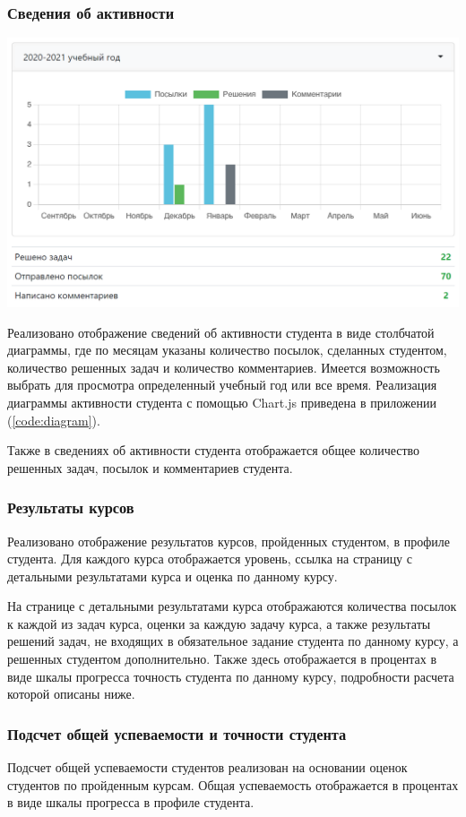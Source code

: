\documentclass[14pt, a4paper, oneside]{extarticle}
\begin{document}
\subsubsection{Сведения об активности}
\begin{center}
    \includegraphics[scale=0.4]{account-activity}
\end{center}

Реализовано отображение сведений об активности студента в виде столбчатой диаграммы, где по месяцам указаны количество посылок, сделанных студентом, количество решенных задач и количество комментариев. Имеется возможность выбрать для просмотра определенный учебный год или все время. Реализация диаграммы активности студента с помощью Chart.js приведена в приложении (\ref{code:diagram}).

Также в сведениях об активности студента отображается общее количество решенных задач, посылок и комментариев студента.
\subsubsection{Результаты курсов}
Реализовано отображение результатов курсов, пройденных студентом, в профиле студента. Для каждого курса отображается уровень, ссылка на страницу с детальными результатами курса и оценка по данному курсу.

На странице с детальными результатами курса отображаются количества посылок к каждой из задач курса, оценки за каждую задачу курса, а также результаты решений задач, не входящих в обязательное задание студента по данному курсу, а решенных студентом дополнительно. Также здесь отображается в процентах в виде шкалы прогресса точность студента по данному курсу, подробности расчета которой описаны ниже.
\subsubsection{Подсчет общей успеваемости и точности студента}
Подсчет общей успеваемости студентов реализован на основании оценок студентов по пройденным курсам. Общая успеваемость отображается в процентах в виде шкалы прогресса в профиле студента.
\end{document}
